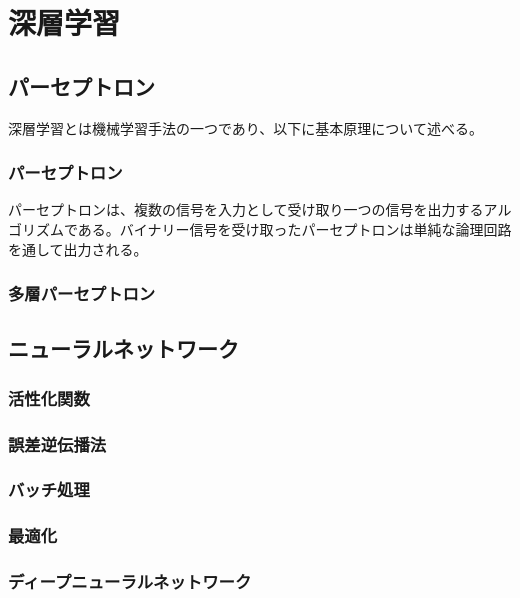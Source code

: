 
\chapter{深層学習} \label{sec:Deeplearning}
\section{パーセプトロン}
 深層学習とは機械学習手法の一つであり、以下に基本原理について述べる。
\subsection{パーセプトロン}
パーセプトロンは、複数の信号を入力として受け取り一つの信号を出力するアルゴリズムである。バイナリー信号を受け取ったパーセプトロンは単純な論理回路を通して出力される。
\subsection{多層パーセプトロン}
\section{ニューラルネットワーク}

\subsection{活性化関数}

\subsection{誤差逆伝播法}

\subsection{バッチ処理}

\subsection{最適化}

\subsection{ディープニューラルネットワーク}

